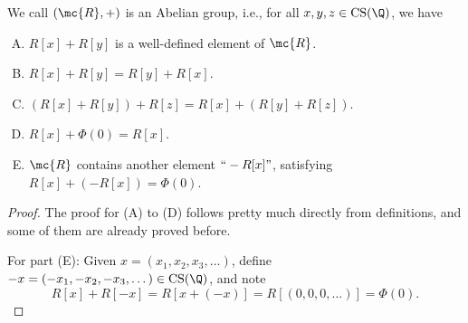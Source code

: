 \begin{nproposition}{}
	We call \((\mc{R},+)\) is an Abelian group, i.e., for all \(x,y,z\in\operatorname{CS}(\Q)\), we have
	\begin{enumerate}[(A)]
		\item \(R[x]+R[y]\) is a well-defined element of \(\mc{R}\).
		
		\item \(R[x]+R[y]=R[y]+R[x]\).
		
		\item \((R[x]+R[y])+R[z]=R[x]+(R[y]+R[z])\).
		
		\item \(R[x]+\Phi(0)=R[x]\).
		
		\item \(\mc{R}\) contains another element \(``-R[x]"\), satisfying \(R[x]+(-R[x])=\Phi(0)\).
	\end{enumerate}
\end{nproposition}
\begin{proof}
	The proof for (A) to (D) follows pretty much directly from definitions, and some of them are already proved before.
	
	\medskip
	
	For part (E): Given \(x=(x_1,x_2,x_3,\dots)\), define \(-x=(-x_1,-x_2,-x_3,\dots)\in\operatorname{CS}(\Q)\), and note
	\begin{equation*}
		R[x]+R[-x]=R[x+(-x)]=R[(0,0,0,\dots)]=\Phi(0).
	\end{equation*}
\end{proof}

